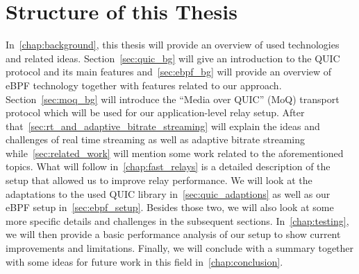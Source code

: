 \section{Structure of this Thesis}\label{sec:structure_of_thesis}

In~\autoref{chap:background}, this thesis will provide an overview of used technologies
and related ideas.
Section~\ref{sec:quic_bg} will give an introduction to the QUIC protocol and its main features 
and~\autoref{sec:ebpf_bg} will provide an overview of eBPF technology together with features related to 
our approach.
Section~\ref{sec:moq_bg} will introduce the ``Media over QUIC'' (MoQ) transport protocol which will be used 
for our application-level relay setup.
After that~\autoref{sec:rt_and_adaptive_bitrate_streaming} will explain the ideas and challenges of 
real time streaming as well as adaptive bitrate streaming while~\autoref{sec:related_work} will 
mention some work related to the aforementioned topics.
What will follow in~\autoref{chap:fast_relays} is a detailed description of the setup that 
allowed us to improve relay performance. 
We will look at the adaptations to the used QUIC library in~\autoref{sec:quic_adaptions} as well as 
our eBPF setup in~\autoref{sec:ebpf_setup}. Besides those two, we will also look at some more specific details and 
challenges in the subsequent sections.
In~\autoref{chap:testing}, we will then provide a basic performance analysis of our setup to show current improvements and limitations.
Finally, we will conclude with a summary together with some ideas for future work in this field in~\autoref{chap:conclusion}.